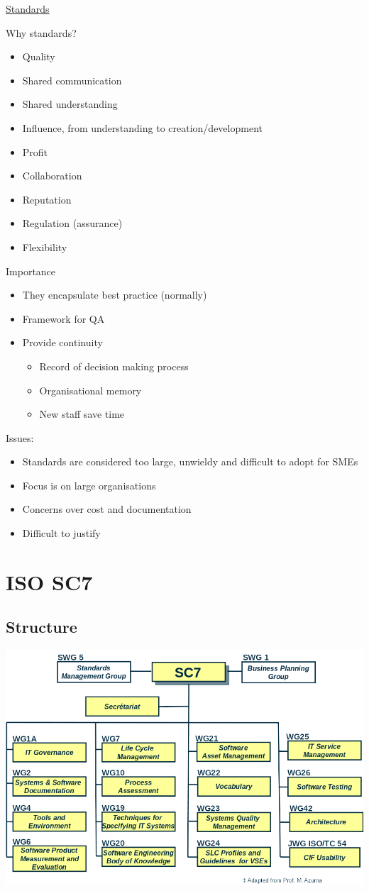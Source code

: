 \documentclass{article}[18pt]
\begin{document}
\begin{center}
\underline{\huge Standards}
\end{center}

Why standards?
\begin{itemize}
	\item Quality
	\item Shared communication
	\item Shared understanding
	\item Influence, from understanding to creation/development
	\item Profit
	\item Collaboration
	\item Reputation
	\item Regulation (assurance)
	\item Flexibility
\end{itemize}
Importance
\begin{itemize}
	\item They encapsulate best practice (normally)
	\item Framework for QA
	\item Provide continuity
	\begin{itemize}
		\item Record of decision making process
		\item Organisational memory
		\item New staff save time
	\end{itemize}
\end{itemize}
Issues:
\begin{itemize}
	\item Standards are considered too large, unwieldy and difficult to adopt for SMEs
	\item Focus is on large organisations
	\item Concerns over cost and documentation
	\item Difficult to justify
\end{itemize}
\section{ISO SC7}
\subsection{Structure}
\begin{center}
	\includegraphics[scale=0.7]{SC7}
\end{center}
\end{document}
